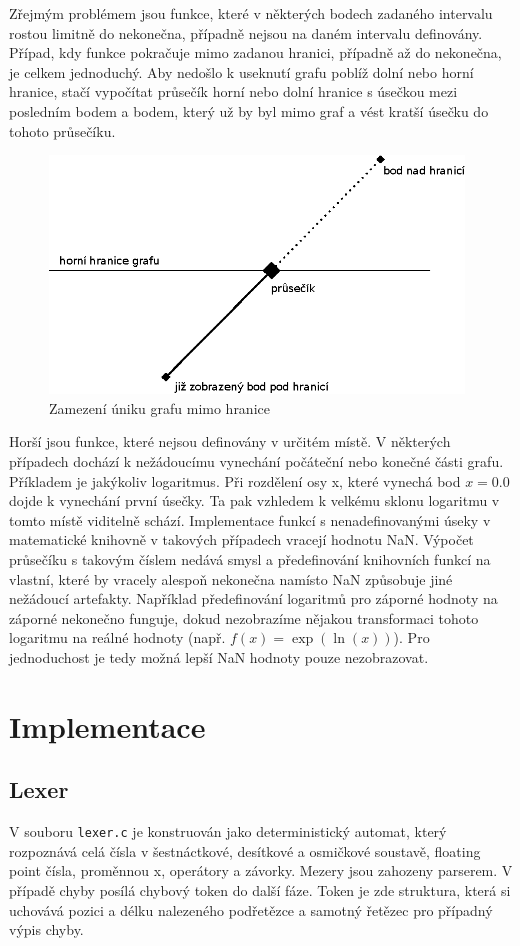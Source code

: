 \documentclass[11pt]{article}
\begin{document}
\clearpage
Zřejmým problémem jsou funkce, které v některých bodech zadaného intervalu
rostou limitně do nekonečna, případně nejsou na daném intervalu definovány.
Případ, kdy funkce pokračuje mimo zadanou hranici, případně až do nekonečna, je
celkem jednoduchý. Aby nedošlo k useknutí grafu poblíž dolní nebo horní
hranice, stačí vypočítat průsečík horní nebo dolní hranice s úsečkou mezi
posledním bodem a bodem, který už by byl mimo graf a vést kratší úsečku do
tohoto průsečíku. 
\begin{figure}[ht!]
\centering
	\includegraphics[width=11cm]{figures/boundary.eps}
	\caption{Zamezení úniku grafu mimo hranice}
\end{figure}

Horší jsou funkce, které nejsou definovány v určitém místě. V některých
případech dochází k nežádoucímu vynechání počáteční nebo konečné části grafu.
Příkladem je jakýkoliv logaritmus. Při rozdělení osy x, které vynechá bod $x =
0.0$ dojde k vynechání první úsečky. Ta pak vzhledem k velkému sklonu logaritmu
v tomto místě viditelně schází. Implementace funkcí s nenadefinovanými úseky v
matematické knihovně v takových případech vracejí hodnotu NaN. Výpočet
průsečíku s takovým číslem nedává smysl a předefinování knihovních funkcí na
vlastní, které by vracely alespoň nekonečna namísto NaN způsobuje jiné
nežádoucí artefakty. Například předefinování logaritmů pro záporné hodnoty na
záporné nekonečno funguje, dokud nezobrazíme nějakou transformaci tohoto
logaritmu na reálné hodnoty (např. $f(x) = \exp(\ln(x))$). Pro jednoduchost je
tedy možná lepší NaN hodnoty pouze nezobrazovat.


\section{Implementace}
\subsection{Lexer} 
V souboru \texttt{lexer.c} je konstruován jako deterministický automat, který
rozpoznává celá čísla v šestnáctkové, desítkové a osmičkové soustavě, floating
point čísla, proměnnou x, operátory a závorky. Mezery jsou zahozeny parserem. V
případě chyby posílá chybový token do další fáze.  Token je zde struktura,
která si uchovává pozici a délku nalezeného podřetězce a samotný řetězec pro
případný výpis chyby.
\end{document}
